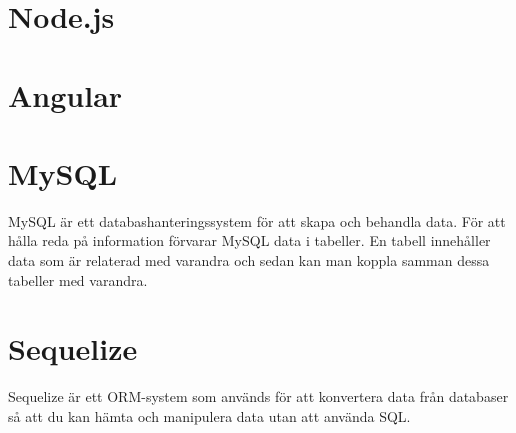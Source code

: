 \section{Node.js}

\section{Angular}

\section{MySQL}
MySQL är ett databashanteringssystem för att skapa och behandla data. För att hålla reda på information förvarar MySQL data i tabeller. En tabell innehåller data som är relaterad med varandra och sedan kan man koppla samman dessa tabeller med varandra.
\cite{mysql}

\section{Sequelize}
Sequelize är ett ORM-system som används för att konvertera data från databaser så att du kan hämta och manipulera data utan att använda SQL.
\cite{sequelize}
